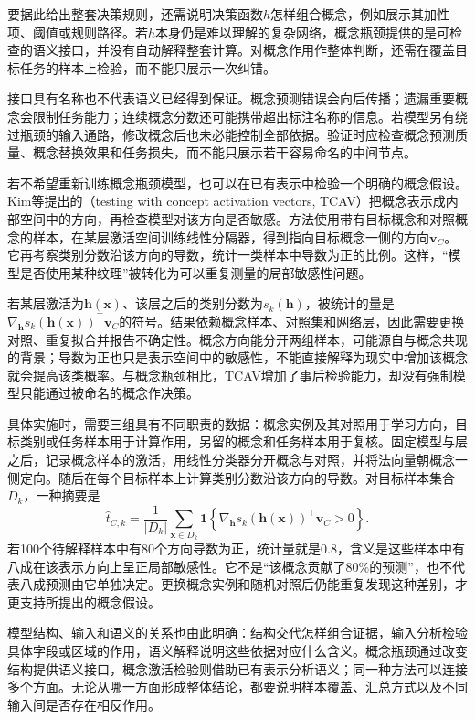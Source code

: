 要据此给出整套决策规则，还需说明决策函数$h$怎样组合概念，例如展示其加性项、阈值或规则路径。若$h$本身仍是难以理解的复杂网络，概念瓶颈提供的是可检查的语义接口，并没有自动解释整套计算。对概念作用作整体判断，还需在覆盖目标任务的样本上检验，而不能只展示一次纠错。

接口具有名称也不代表语义已经得到保证。概念预测错误会向后传播；遗漏重要概念会限制任务能力；连续概念分数还可能携带超出标注名称的信息。若模型另有绕过瓶颈的输入通路，修改概念后也未必能控制全部依据。验证时应检查概念预测质量、概念替换效果和任务损失，而不能只展示若干容易命名的中间节点。

若不希望重新训练概念瓶颈模型，也可以在已有表示中检验一个明确的概念假设。Kim等提出的（testing with concept activation vectors, TCAV）把概念表示成内部空间中的方向，再检查模型对该方向是否敏感。方法使用带有目标概念和对照概念的样本，在某层激活空间训练线性分隔器，得到指向目标概念一侧的方向$\bm{v}_C$。它再考察类别分数沿该方向的导数，统计一类样本中导数为正的比例。这样，“模型是否使用某种纹理”被转化为可以重复测量的局部敏感性问题。

若某层激活为$\bm{h}(\bm{x})$、该层之后的类别分数为$s_k(\bm{h})$，被统计的量是$\nabla_{\bm h}s_k(\bm{h}(\bm{x}))^\top\bm{v}_C$的符号。结果依赖概念样本、对照集和网络层，因此需要更换对照、重复拟合并报告不确定性。概念方向能分开两组样本，可能源自与概念共现的背景；导数为正也只是表示空间中的敏感性，不能直接解释为现实中增加该概念就会提高该类概率。与概念瓶颈相比，TCAV增加了事后检验能力，却没有强制模型只能通过被命名的概念作决策。

具体实施时，需要三组具有不同职责的数据：概念实例及其对照用于学习方向，目标类别或任务样本用于计算作用，另留的概念和任务样本用于复核。固定模型与层之后，记录概念样本的激活，用线性分类器分开概念与对照，并将法向量朝概念一侧定向。随后在每个目标样本上计算类别分数沿该方向的导数。对目标样本集合$D_k$，一种摘要是
\[
 \widehat t_{C,k}
 =\frac1{|D_k|}\sum_{\bm{x}\in D_k}
 \mathbf1\!\left\{
 \nabla_{\bm h}s_k(\bm h(\bm{x}))^\top\bm v_C>0
 \right\}.
\]
若100个待解释样本中有80个方向导数为正，统计量就是0.8，含义是这些样本中有八成在该表示方向上呈正局部敏感性。它不是“该概念贡献了80\%的预测”，也不代表八成预测由它单独决定。更换概念实例和随机对照后仍能重复发现这种差别，才更支持所提出的概念假设。

模型结构、输入和语义的关系也由此明确：结构交代怎样组合证据，输入分析检验具体字段或区域的作用，语义解释说明这些依据对应什么含义。概念瓶颈通过改变结构提供语义接口，概念激活检验则借助已有表示分析语义；同一种方法可以连接多个方面。无论从哪一方面形成整体结论，都要说明样本覆盖、汇总方式以及不同输入间是否存在相反作用。

